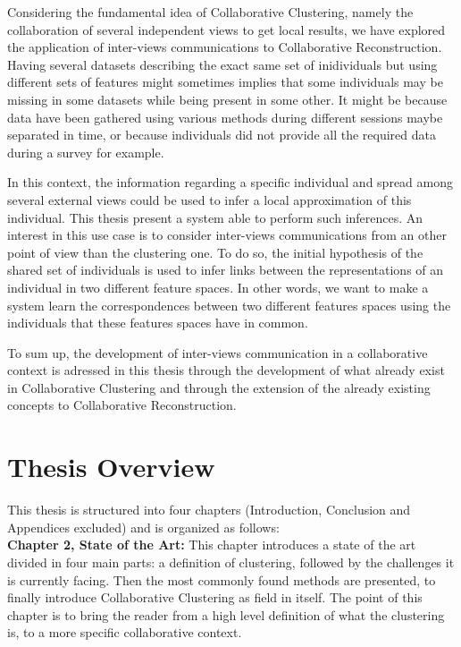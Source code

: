 Considering the fundamental idea of Collaborative Clustering, namely the collaboration of several independent views to get local results, we have explored the application of inter-views communications to Collaborative Reconstruction. Having several datasets describing the exact same set of inidividuals but using different sets of features might sometimes implies that some individuals may be missing in some datasets while being present in some other. It might be because data have been gathered using various methods during different sessions maybe separated in time, or because individuals did not provide all the required data during a survey for example. 

In this context, the information regarding a specific individual and spread among several external views could be used to infer a local approximation of this individual. This thesis present a system able to perform such inferences. An interest in this use case is to consider inter-views communications from an other point of view than the clustering one. To do so, the initial hypothesis of the shared set of individuals is used to infer links between the representations of an individual in two different feature spaces. In other words, we want to make a system learn the correspondences between two different features spaces using the individuals that these features spaces have in common.

To sum up, the development of inter-views communication in a collaborative context is adressed in this thesis through the development of what already exist in Collaborative Clustering and through the extension of the already existing concepts to Collaborative Reconstruction.

\section{Thesis Overview}

This thesis is structured into four chapters (Introduction, Conclusion and Appendices excluded) and is organized as follows:\\

\textbf{Chapter 2, State of the Art:} This chapter introduces a state of the art divided in four main parts: a definition of clustering, followed by the challenges it is currently facing. Then the most commonly found methods are presented, to finally introduce Collaborative Clustering as field in itself. The point of this chapter is to bring the reader from a high level definition of what the clustering is, to a more specific collaborative context.\\

